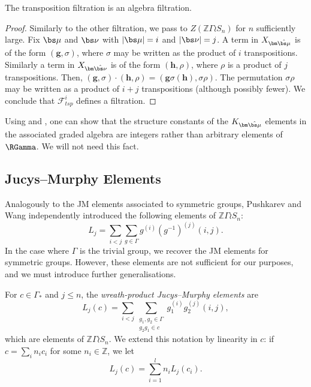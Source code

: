 \begin{proposition} \label{length_filtration_prop}
The transposition filtration is an algebra filtration. \end{proposition}

\begin{proof}
Similarly to the other filtration, we pass to $Z(\mathbb{Z}\Gamma \wr S_n)$ for $n$ sufficiently large. Fix $\bs \mu$ and $\bs \nu$ with $|\bs \mu| = i$ and $|\bs \nu| = j$. A term in $X_{\bm\hat{\bs \mu}}$ is of the form $(\mathbf{g}, \sigma)$, where $\sigma$ may be written as the product of $i$ transpositions. Similarly a term in $X_{\bm\hat{\bs \nu}}$ is of the form $(\mathbf{h}, \rho)$, where $\rho$ is a product of $j$ transpositions. Then, $(\mathbf{g}, \sigma) \cdot (\mathbf{h}, \rho) = (\mathbf{g}\sigma(\mathbf{h}), \sigma\rho)$. The permutation $\sigma \rho$ may be written as a product of $i+j$ transpositions (although possibly fewer). We conclude that $\mathcal{F}_{tsp}^i$ defines a filtration.
\end{proof}

\begin{remark}
Using \cite[Lemma 3.2]{FarahatHigman} and \cite[Proposition 2.9]{Wang1}, one can show that the structure constants of the $K_{\bm\hat{\bs\mu}}$ elements in the associated graded algebra are integers rather than arbitrary elements of $\RGamma$. We will not need this fact.
\end{remark}




\subsection{Jucys--Murphy Elements}
Analogously to the JM elements associated to symmetric groups, Pushkarev \cite{Pushkarev} and Wang \cite{Wang2} independently introduced the following elements of $\mathbb{Z} \Gamma \wr S_n$:
\[
L_j =
\sum_{i<j} \sum_{g \in \Gamma} g^{(i)} (g^{-1})^{(j)} (i, j).
\]
In the case where $\Gamma$ is the trivial group, we recover the JM elements for symmetric groups. However, these elements are not sufficient for our purposes, and we must introduce further generalisations.

\begin{definition}
For $c \in \Gamma_*$ and $j \leq n$, the \emph{wreath-product Jucys--Murphy elements} are
\[
L_j(c) = \sum_{i < j} \sum_{\substack{g_1, g_2 \in \Gamma \\ g_2g_1 \in c}} g_1^{(i)} g_2^{(j)} (i, j),
\]
which are elements of $\mathbb{Z} \Gamma \wr S_n$. We extend this notation by linearity in $c$: if $c = \sum_i  n_i c_i$ for some $n_i \in \mathbb{Z}$, we let
\[
L_j(c) = \sum_{i=1}^l n_i L_j(c_i).
\]
\end{definition}

